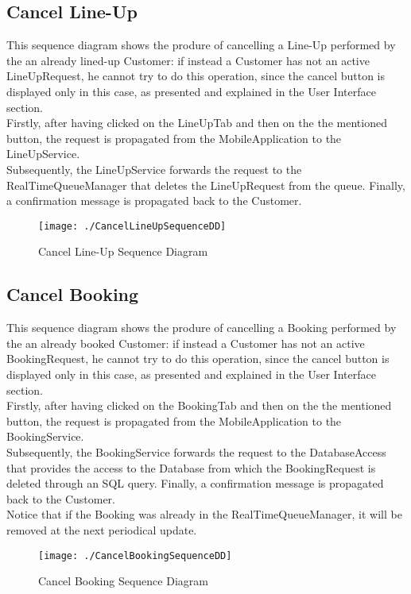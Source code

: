 \subsection{Cancel Line-Up}
This sequence diagram shows the produre of cancelling a Line-Up performed by the an already lined-up Customer: if instead a Customer has not an active LineUpRequest, he cannot try to do this operation, since the cancel button is displayed only in this case, as presented and explained in the User Interface section. \\
Firstly, after having clicked on the LineUpTab and then on the the mentioned button, the request is propagated from the MobileApplication to the LineUpService. \\ Subsequently, the LineUpService forwards the request to the RealTimeQueueManager that deletes the LineUpRequest from the queue. Finally, a confirmation message is propagated back to the Customer. 
\begin{figure}[H]
\centerline{\texttt{[image: ./CancelLineUpSequenceDD]}}
\caption{Cancel Line-Up Sequence Diagram}
\end{figure}


\subsection{Cancel Booking}
This sequence diagram shows the produre of cancelling a Booking performed by the an already booked Customer: if instead a Customer has not an active BookingRequest, he cannot try to do this operation, since the cancel button is displayed only in this case, as presented and explained in the User Interface section. \\
Firstly, after having clicked on the BookingTab and then on the the mentioned button, the request is propagated from the MobileApplication to the BookingService. \\ Subsequently, the BookingService forwards the request to the DatabaseAccess that provides the access to the Database from which the BookingRequest is deleted through an SQL query. Finally, a confirmation message is propagated back to the Customer. 		\\
Notice that if the Booking was already in the RealTimeQueueManager, it will be removed at the next periodical update.
\begin{figure}[H]
\centerline{\texttt{[image: ./CancelBookingSequenceDD]}}
\caption{Cancel Booking Sequence Diagram}
\end{figure}


